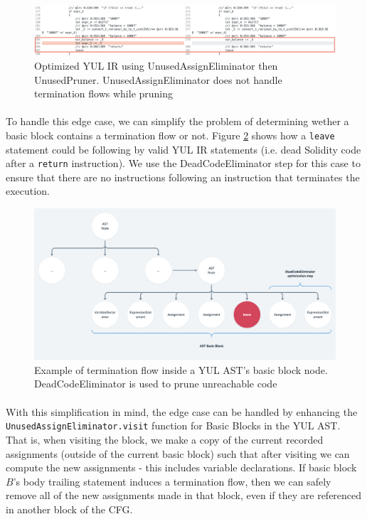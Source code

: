\begin{figure}
    \centering
    \includegraphics[width=\textwidth]{images/unused_assign_eliminator_termination2.png}
    \caption{Optimized YUL IR using UnusedAssignEliminator then UnusedPruner. UnusedAssignEliminator does not handle termination flows while pruning}
    \label{fig:unused-assign-eliminator-termination2}
\end{figure}

\paragraph*{}
To handle this edge case, we can simplify the problem of determining wether a basic block contains a termination flow or not. Figure \ref*{fig:basic-block-termination-ast-example} shows how a \lstinline[columns=fixed]{leave} statement could be following by valid YUL IR statements (i.e. dead Solidity code after a \lstinline[columns=fixed]{return} instruction). We use the DeadCodeEliminator step for this case to ensure that there are no instructions following an instruction that terminates the execution.

\begin{figure}
    \centering
    \includegraphics[width=\textwidth]{images/basic_block_termination_ast_example.png}
    \caption{Example of termination flow inside a YUL AST's basic block node. DeadCodeEliminator is used to prune unreachable code}
    \label{fig:basic-block-termination-ast-example}
\end{figure}

\paragraph*{}
With this simplification in mind, the edge case can be handled by enhancing the \\ \lstinline[columns=fixed]{UnusedAssignEliminator.visit} function for Basic Blocks in the YUL AST. That is, when visiting the block, we make a copy of the current recorded assignments (outside of the current basic block) such that after visiting we can compute the new assignments - this includes variable declarations. If basic block $B$'s body trailing statement induces a termination flow, then we can safely remove all of the new assignments made in that block, even if they are referenced in another block of the CFG.

